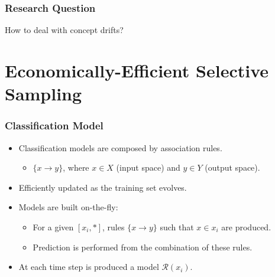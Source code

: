 \documentclass[14pt]{beamer}
\begin{document}
\begin{frame}\frametitle{Research Question}

\begin{center}
\large{How to deal with concept drifts?}
\end{center}
\end{frame}

\section{Economically-Efficient Selective Sampling}
\begin{frame}\frametitle{Classification Model}
\begin{itemize}
\item Classification models are composed by association rules.
  \begin{itemize}
    \item $\{x \to y\}$, where $x \in X$ (input space) and $y \in Y$ (output space).
  \end{itemize}
\item Efficiently updated as the training set evolves.
\item Models are built on-the-fly:
  \begin{itemize}
    \item For a given $[x_i, *]$, rules $\{x \to y\}$ such that $x \in x_i$ are produced.
    \item Prediction is performed from the combination of these rules.
  \end{itemize}
\item At each time step is produced a model $\mathcal{R}(x_i)$.
\end{itemize}
\end{frame}
\end{document}
